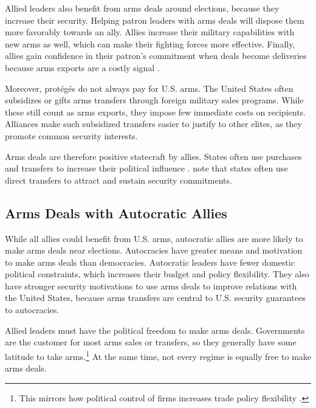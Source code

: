 \documentclass[12pt]{article}
\begin{document}
Allied leaders also benefit from arms deals around elections, because they increase their security.
Helping patron leaders with arms deals will dispose them more favorably towards an ally. 
Allies increase their military capabilities with new arms as well, which can make their fighting forces more effective. 
Finally, allies gain confidence in their patron's commitment when deals become deliveries because arms exports are a costly signal \citep{McManusYarhi-Milo2017}.


Moreover, prot{\'e}g{\'e}s do not always pay for U.S. arms.
The United States often subsidizes or gifts arms transfers through foreign military sales programs. 
While these still count as arms exports, they impose few immediate costs on recipients.
Alliances make such subsidized transfers easier to justify to other elites, as they promote common security interests. 


Arms deals are therefore positive statecraft by allies. 
States often use purchases and transfers to increase their political influence \citep[pg. 42-3]{Baldwin2020}.
\citet[pg. 184-5]{IkenberryGrieco2003} note that states often use direct transfers to attract and sustain security commitments.  



\subsection{Arms Deals with Autocratic Allies}


While all allies could benefit from U.S. arms, autocratic allies are more likely to make arms deals near elections. 
Autocracies have greater means and motivation to make arms deals than democracies.
Autocratic leaders have fewer domestic political constraints, which increases their budget and policy flexibility. 
They also have stronger security motivations to use arms deals to improve relations with the United States, because arms transfers are central to U.S. security guarantees to autocracies.


Allied leaders must have the political freedom to make arms deals.
Governments are the customer for most arms sales or transfers, so they generally have some latitude to take arms.\footnote{This mirrors how political control of firms increases trade policy flexibility \citep{Davisetal2019}.}
At the same time, not every regime is equally free to make arms deals. 
\end{document}
